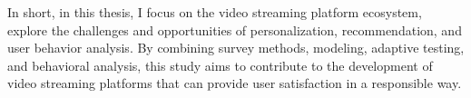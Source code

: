 In short, in this thesis, I focus on the video streaming platform ecosystem, explore the challenges and opportunities of personalization, recommendation, and user behavior analysis. 
By combining survey methods, modeling, adaptive testing, and behavioral analysis, this study aims to contribute to the development of video streaming platforms that can provide user satisfaction in a responsible way.








